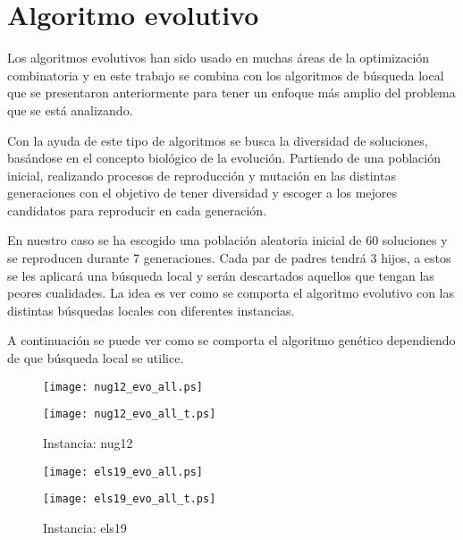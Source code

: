 \section*{Algoritmo evolutivo}

Los algoritmos evolutivos han sido usado en muchas áreas de la optimización combinatoria\cite{evo:07:cec} y en este trabajo se combina con los algoritmos de búsqueda local que se presentaron anteriormente para tener un enfoque más amplio del problema que se está analizando.

Con la ayuda de este tipo de algoritmos se busca la diversidad de soluciones, basándose en el concepto biológico de la evolución. Partiendo de una población inicial, realizando procesos de reproducción y mutación en las distintas generaciones con el objetivo de tener diversidad y escoger a los mejores candidatos para reproducir en cada generación.

En nuestro caso se ha escogido una población aleatoria inicial de 60 soluciones y se reproducen durante 7 generaciones. Cada par de padres tendrá 3 hijos, a estos se les aplicará una búsqueda local y serán descartados aquellos que tengan las peores cualidades. La idea es ver como se comporta el algoritmo evolutivo con las distintas búsquedas locales con diferentes instancias.

A continuación se puede ver como se comporta el algoritmo genético dependiendo de que búsqueda local se utilice.

\begin{figure}
    \centering
    \begin{minipage}{0.5\textwidth}
        \centering
        \texttt{[image: nug12\_evo\_all.ps]} %
    \end{minipage}\hfill
    \begin{minipage}{0.5\textwidth}
        \centering
        \texttt{[image: nug12\_evo\_all\_t.ps]} %
    \end{minipage}
    \caption*{Instancia: nug12\cite{nug12}}
\end{figure}

\begin{figure}
    \centering
    \begin{minipage}{0.5\textwidth}
        \centering
        \texttt{[image: els19\_evo\_all.ps]} %
    \end{minipage}\hfill
    \begin{minipage}{0.5\textwidth}
        \centering
        \texttt{[image: els19\_evo\_all\_t.ps]} %
    \end{minipage}
    \caption*{Instancia: els19\cite{els19}}
\end{figure}

